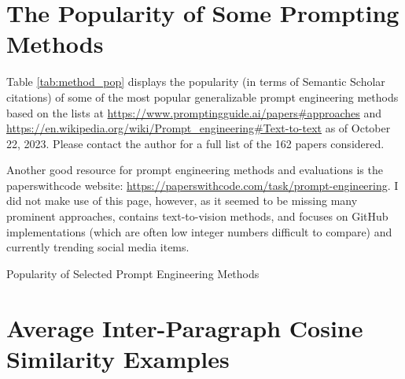 \documentclass[11pt]{article}
\begin{document}



\clearpage
\newpage

\onecolumn
\setlength{\parindent}{0cm}
\setlength\parskip{1em plus 0.1em minus 0.2em}
\appendix

\section{The Popularity of Some Prompting Methods}
\label{sec:popularity}

Table \ref{tab:method_pop} displays the popularity (in terms of Semantic Scholar citations) of some of the most popular generalizable prompt engineering methods based on the lists at \url{https://www.promptingguide.ai/papers#approaches} and \url{https://en.wikipedia.org/wiki/Prompt_engineering#Text-to-text} as of October 22, 2023. Please contact the author for a full list of the 162 papers considered.

Another good resource for prompt engineering methods and evaluations is the paperswithcode website: \url{https://paperswithcode.com/task/prompt-engineering}. I did not make use of this page, however, as it seemed to be missing many prominent approaches, contains text-to-vision methods, and focuses on GitHub implementations (which are often low integer numbers difficult to compare) and currently trending social media items.

\begin{landscape}

  \begin{centering}

    \begin{table}[h]
      \caption{Popularity of Selected Prompt Engineering Methods}
      \small
      
      \label{tab:method_pop}
    \end{table}

  \end{centering}

\end{landscape}

\clearpage
\newpage

\section{Average Inter-Paragraph Cosine Similarity Examples}
\label{sec:avg_inter_pragraph_cosine_sim_ex}
\end{document}
